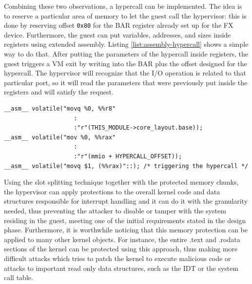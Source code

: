 Combining these two observations, a hypercall can be implemented. The idea is to reserve a particular area of memory to let the guest call the hypervisor: this is done by reserving offset \texttt{0x80} for the BAR register already set up for the FX device. Furthermore, the guest can put variables, addresses, and sizes inside registers using extended assembly. Listing \ref{list:assembly-hypercall} shows a simple way to do that. After putting the parameters of the hypercall inside registers, the guest triggers a VM exit by writing into the BAR plus the offset designed for the hypercall. The hypervisor will recognize that the I/O operation is related to that particular port, so it will read the parameters that were previously put inside the registers and will satisfy the request. 

\begin{lstlisting}[style=c, caption={Example of hypercall: putting the base address of the loaded kernel module inside register \texttt{r8}, then triggering the VM exit}, label={list:assembly-hypercall}]
__asm__ volatile("movq %0, %%r8" 
                    :
                    :"r"(THIS_MODULE->core_layout.base));
__asm__ volatile("mov %0, %%rax" 
                    :
                    :"r"(mmio + HYPERCALL_OFFSET));
__asm__ volatile("movq $1, (%%rax)"::); /* triggering the hypercall */
\end{lstlisting}
\par 
Using the slot splitting technique together with the protected memory chunks, the hypervisor can apply protections to the overall kernel code and data structures responsible for interrupt handling and it can do it with the granularity needed, thus preventing the attacker to disable or tamper with the system residing in the guest, meeting one of the initial requirements stated in the design phase. Furthermore, it is worthwhile noticing that this memory protection can be applied to many other kernel objects. For instance, the entire .text and .rodata sections of the kernel can be protected using this approach, thus making more difficult attacks which tries to patch the kernel to execute malicious code or attacks to important read only data structures, such as the IDT or the system call table.

